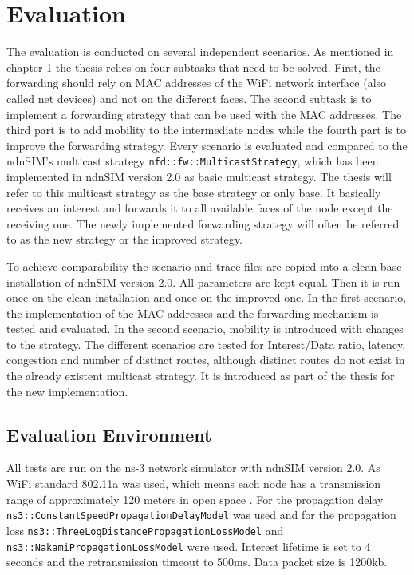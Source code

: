 \chapter{Evaluation}

The evaluation is conducted on several independent scenarios. As mentioned in chapter 1 the thesis relies on four subtasks that need to be solved. First, the forwarding should rely on MAC addresses of the WiFi network interface (also called net devices) and not on the different faces. The second subtask is to implement a forwarding strategy that can be used with the MAC addresses. The third part is to add mobility to the intermediate nodes while the fourth part is to improve the forwarding strategy. Every scenario is evaluated and compared to the ndnSIM's multicast strategy \texttt{nfd::fw::MulticastStrategy}, which has been implemented in ndnSIM version 2.0 as basic multicast strategy. The thesis will refer to this multicast strategy as the base strategy or only base. It basically receives an interest and forwards it to all available faces of the node except the receiving one. The newly implemented forwarding strategy will often be referred to as the new strategy or the improved strategy.

To achieve comparability the scenario and trace-files are copied into a clean base installation of ndnSIM version 2.0. All parameters are kept equal. Then it is run once on the clean installation and once on the improved one. In the first scenario, the implementation of the MAC addresses and the forwarding mechanism is tested and evaluated. In the second scenario, mobility is introduced with changes to the strategy. The different scenarios are tested for Interest/Data ratio, latency, congestion and number of distinct routes, although distinct routes do not exist in the already existent multicast strategy. It is introduced as part of the thesis for the new implementation.

\section{Evaluation Environment}

All tests are run on the ns-3 network simulator with ndnSIM version 2.0.  As WiFi standard 802.11a was used, which means each node has a transmission range of approximately 120 meters in open space \cite{wifi80211a} . For the propagation delay \texttt{ns3::Constant}\texttt{SpeedPropagation}\texttt{DelayModel} was used and for the propagation loss \texttt{ns3::Three}\texttt{LogDistance}\texttt{Propagation}\texttt{LossModel} and \texttt{ns3::}\texttt{Nakami}\texttt{Propagation}\texttt{LossModel} were used. Interest lifetime is set to 4 seconds and the retransmission timeout to 500ms. Data packet size is 1200kb.

